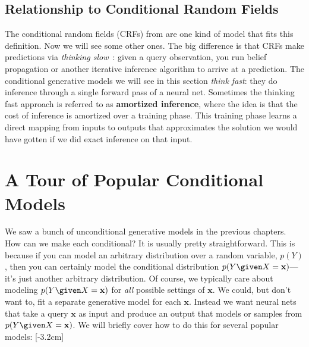 \subsection{Relationship to Conditional Random Fields}
The conditional random fields (CRFs) from \chap{\ref{chapter:probabilistic_graphical_models}} are one kind of model that fits this definition. Now we will see some other ones. The big difference is that CRFs make predictions via \textit{thinking slow}~\cite{kahneman2011thinking}: given a query observation, you run belief propagation or another iterative inference algorithm to arrive at a prediction. The conditional generative models we will see in this section \textit{think fast}: they do inference through a single forward pass of a neural net. Sometimes the thinking fast approach is referred to as \textbf{amortized inference}, where the idea is that the cost of inference is amortized over a training phase. This training phase learns a direct mapping from inputs to outputs that approximates the solution we would have gotten if we did exact inference on that input.


\section{A Tour of Popular Conditional Models}
We saw a bunch of unconditional generative models in the previous chapters. How can we make each conditional? It is usually pretty straightforward. This is because if you can model an arbitrary distribution over a random variable, $p(Y)$, then you can certainly model the conditional distribution $p(Y \given X=\mathbf{x})$—it's just another arbitrary distribution. Of course, we typically care about modeling $p(Y \given X=\mathbf{x})$ for \textit{all} possible settings of $\mathbf{x}$. We could, but don't want to, fit a separate generative model for each $\mathbf{x}$. Instead we want neural nets that take a query $\mathbf{x}$ as input and produce an output that models or samples from $p(Y \given X=\mathbf{x})$. We will briefly cover how to do this for several popular models:
[-3.2cm]


